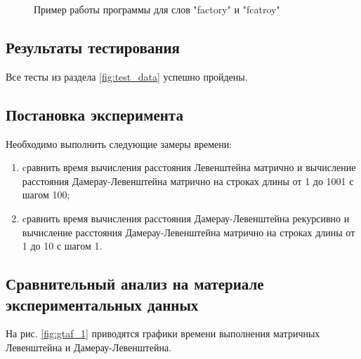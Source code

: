 \documentclass[a4paper,12pt]{article}
\begin{document}
        
            \begin{figure}[h!]
                \caption{Пример работы программы для слов "factory" и "fcatroy"}
                \label{fig:image_test_2}
            \end{figure}
            
    \subsection{Результаты тестирования}
    Все тесты из раздела \ref{fig:test_data} успешно пройдены.
    \subsection{Постановка эксперимента}
    
    Необходимо выполнить следующие замеры времени:
    \begin{enumerate} 
        \item cравнить время вычисления расстояния Левенштейна матрично и вычисление расстояния Дамерау-Левенштейна матрично на строках длины от 1 до 1001 с шагом 100;
        \item cравнить время вычисления расстояния Дамерау-Левенштейна рекурсивно и вычисление расстояния Дамерау-Левенштейна матрично на строках длины от 1 до 10 с шагом 1.
    \end{enumerate} 
    
    
    \subsection{Сравнительный анализ на материале экспериментальных данных}
        На рис. \ref{fig:gtaf_1} приводятся графики времени выполнения матричных Левенштейна и Дамерау-Левенштейна.
        
\end{document}
